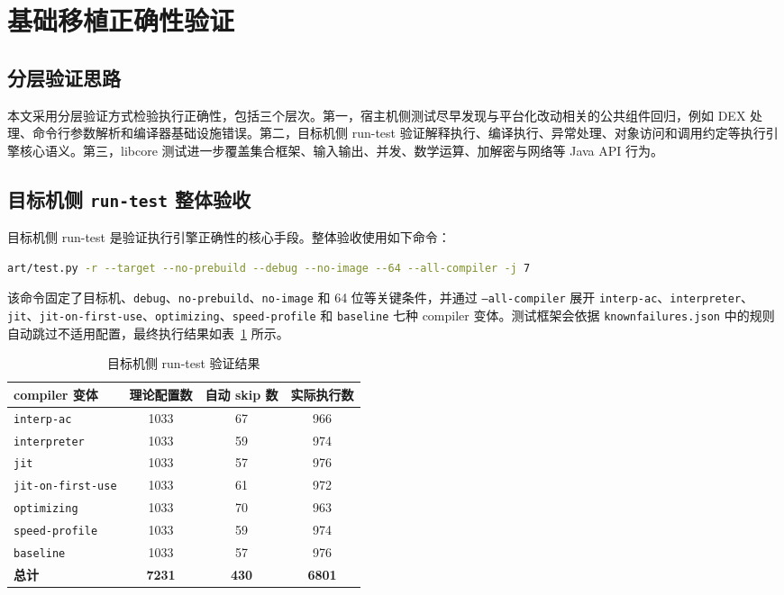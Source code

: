 \section{基础移植正确性验证}

\subsection{分层验证思路}

本文采用分层验证方式检验执行正确性，包括三个层次。第一，宿主机侧测试尽早发现与平台化改动相关的公共组件回归，例如 DEX 处理、命令行参数解析和编译器基础设施错误。第二，目标机侧 run-test 验证解释执行、编译执行、异常处理、对象访问和调用约定等执行引擎核心语义。第三，libcore 测试进一步覆盖集合框架、输入输出、并发、数学运算、加解密与网络等 Java API 行为。

\subsection{\texorpdfstring{目标机侧 \texttt{run-test} 整体验收}{目标机侧 run-test 整体验收}}

目标机侧 run-test 是验证执行引擎正确性的核心手段。整体验收使用如下命令：
\begin{lstlisting}[language=bash,basicstyle=\ttfamily\small]
art/test.py -r --target --no-prebuild --debug --no-image --64 --all-compiler -j 7
\end{lstlisting}

该命令固定了目标机、\texttt{debug}、\texttt{no-prebuild}、\texttt{no-image} 和 64 位等关键条件，并通过 \texttt{--all-compiler} 展开 \texttt{interp-ac}、\texttt{interpreter}、\texttt{jit}、\texttt{jit-on-first-use}、\texttt{optimizing}、\texttt{speed-profile} 和 \texttt{baseline} 七种 compiler 变体。测试框架会依据 \texttt{knownfailures.json} 中的规则自动跳过不适用配置，最终执行结果如表~\ref{tab:target-run-test-result} 所示。

\begin{table}[htbp]
    \centering
    \caption{目标机侧 run-test 验证结果}
    \label{tab:target-run-test-result}
    \begin{tabular}{lccc}
        \hline
        \textbf{compiler 变体} & \textbf{理论配置数} & \textbf{自动 skip 数} & \textbf{实际执行数} \\
        \hline
        \texttt{interp-ac} & 1033 & 67 & 966 \\
        \texttt{interpreter} & 1033 & 59 & 974 \\
        \texttt{jit} & 1033 & 57 & 976 \\
        \texttt{jit-on-first-use} & 1033 & 61 & 972 \\
        \texttt{optimizing} & 1033 & 70 & 963 \\
        \texttt{speed-profile} & 1033 & 59 & 974 \\
        \texttt{baseline} & 1033 & 57 & 976 \\
        \hline
        \textbf{总计} & \textbf{7231} & \textbf{430} & \textbf{6801} \\
        \hline
    \end{tabular}
\end{table}

